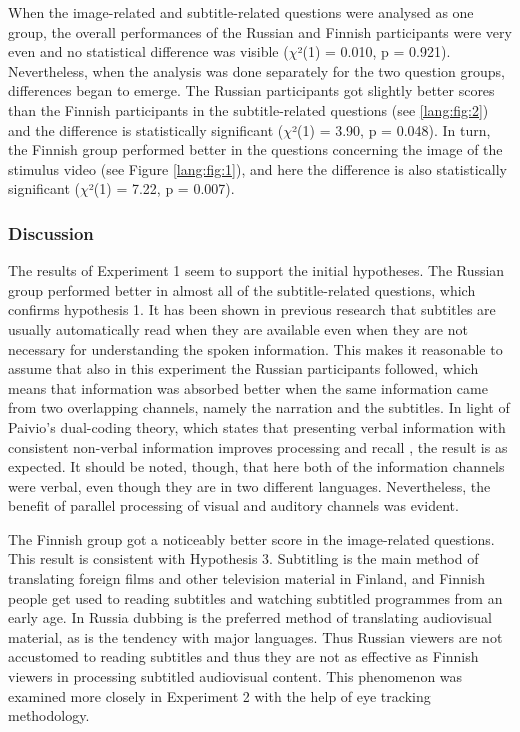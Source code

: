 \documentclass[output=paper]{langsci/langscibook}
\begin{document}
When the image-related and subtitle-related questions were analysed as one group, the overall performances of the Russian and Finnish participants were very even and no statistical difference was visible ($\chi $²(1) = 0.010, p = 0.921). Nevertheless, when the analysis was done separately for the two question groups, differences began to emerge. The Russian participants got slightly better scores than the Finnish participants in the subtitle-related questions (see \ref{lang:fig:2}) and the difference is statistically significant ($\chi $²(1) = 3.90, p = 0.048).  In turn, the Finnish group performed better in the questions concerning the image of the stimulus video (see Figure \ref{lang:fig:1}), and here the difference is also statistically significant ($\chi $²(1) = 7.22, p = 0.007).

\subsubsection{Discussion}

The results of Experiment 1 seem to support the initial hypotheses. The Russian group performed better in almost all of the subtitle-related questions, which confirms hypothesis 1. It has been shown in previous research \citep{dydewalle1987} that subtitles are usually automatically read when they are available even when they are not necessary for understanding the spoken information. This makes it reasonable to assume that also in this experiment the Russian participants followed, which means that information was absorbed better when the same information came from two overlapping channels, namely the narration and the subtitles. In light of Paivio’s dual-coding theory, which states that presenting verbal information with consistent non-verbal information improves processing and recall \citep{Paivio1986}, the result is as expected. It should be noted, though, that here both of the information channels were verbal, even though they are in two different languages. Nevertheless, the benefit of parallel processing of visual and auditory channels was evident. 

The Finnish group got a noticeably better score in the image-related questions. This result is consistent with Hypothesis 3. Subtitling is the main method of translating foreign films and other television material in Finland, and Finnish people get used to reading subtitles and watching subtitled programmes from an early age. In Russia dubbing is the preferred method of translating audiovisual material, as is the tendency with major languages. Thus Russian viewers are not accustomed to reading subtitles and thus they are not as effective as Finnish viewers in processing subtitled audiovisual content. This phenomenon was examined more closely in Experiment 2 with the help of eye tracking methodology.
\end{document}
